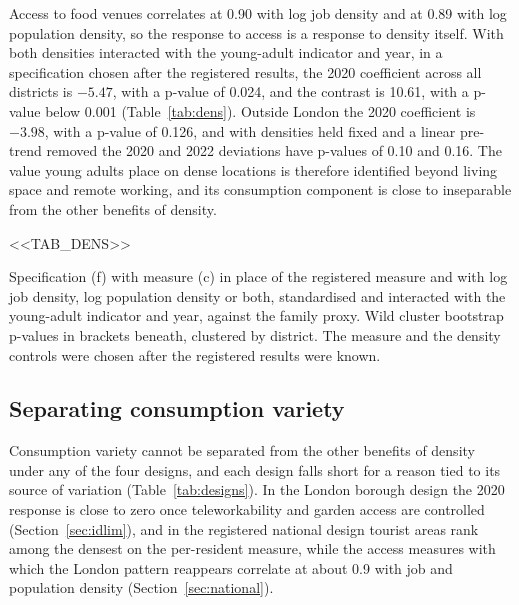 \documentclass[11pt,a4paper]{article}
\newcommand{\tabnote}[1]{\par\smallskip\parbox{\linewidth}{\footnotesize #1}}
\begin{document}
Access to food venues correlates at 0.90 with log job density and at 0.89 with log population density, so the response to access is a response to density itself. With both densities interacted with the young-adult indicator and year, in a specification chosen after the registered results, the 2020 coefficient across all districts is $-5.47$, with a p-value of 0.024, and the contrast is 10.61, with a p-value below 0.001 (Table~\ref{tab:dens}). Outside London the 2020 coefficient is $-3.98$, with a p-value of 0.126, and with densities held fixed and a linear pre-trend removed the 2020 and 2022 deviations have p-values of 0.10 and 0.16. The value young adults place on dense locations is therefore identified beyond living space and remote working, and its consumption component is close to inseparable from the other benefits of density.

\begin{table}[htbp]
\centering
\caption{Access to food venues with density controls}\label{tab:dens}
\small
<<TAB_DENS>>
\tabnote{Specification (f) with measure (c) in place of the registered measure and with log job density, log population density or both, standardised and interacted with the young-adult indicator and year, against the family proxy. Wild cluster bootstrap p-values in brackets beneath, clustered by district. The measure and the density controls were chosen after the registered results were known.}
\end{table}

\subsection{Separating consumption variety}\label{sec:separate}

Consumption variety cannot be separated from the other benefits of density under any of the four designs, and each design falls short for a reason tied to its source of variation (Table~\ref{tab:designs}). In the London borough design the 2020 response is close to zero once teleworkability and garden access are controlled (Section~\ref{sec:idlim}), and in the registered national design tourist areas rank among the densest on the per-resident measure, while the access measures with which the London pattern reappears correlate at about 0.9 with job and population density (Section~\ref{sec:national}).
\end{document}
